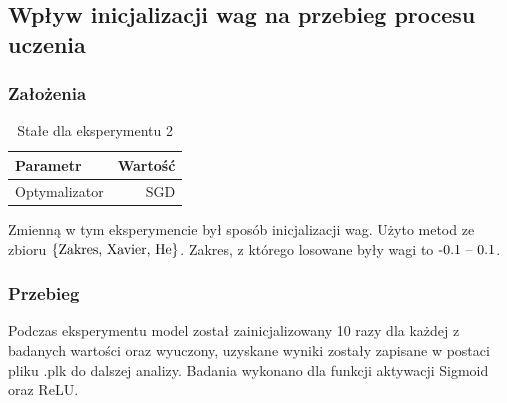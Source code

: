 \documentclass{article}
\begin{document}
\newpage
\subsection{Wpływ inicjalizacji wag na przebieg procesu uczenia}
\subsubsection*{Założenia}
\begin{table}[H]
	\caption{Stałe dla eksperymentu 2}
	\label{tabela-const-2}
	\centering
	\begin{tabular}{lr}
		\toprule
		Parametr      & Wartość \\
		\midrule
		Optymalizator & SGD       \\
		\bottomrule
	\end{tabular}
\end{table}

Zmienną w tym eksperymencie był sposób inicjalizacji wag. Użyto metod ze zbioru \(\{$Zakres, Xavier, He$\}\). Zakres, z którego losowane były wagi to \($-0.1 -- 0.1$\).
\subsubsection*{Przebieg}

Podczas eksperymentu model został zainicjalizowany 10 razy dla każdej z badanych wartości oraz wyuczony, uzyskane wyniki zostały zapisane w postaci pliku .plk do dalszej analizy. Badania wykonano dla funkcji aktywacji Sigmoid oraz ReLU.
\end{document}
